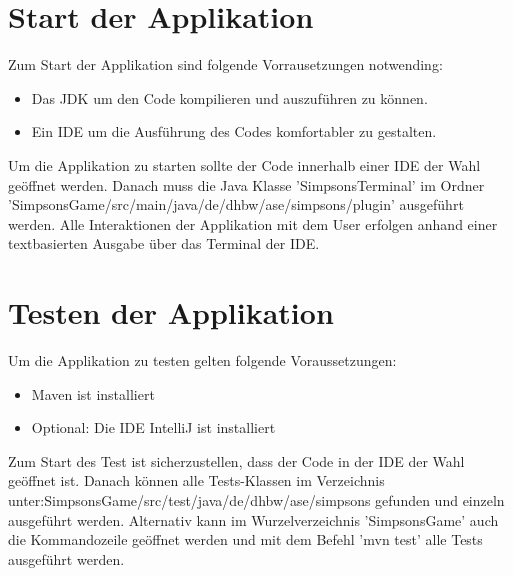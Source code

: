 \section{Start der Applikation}
Zum Start der Applikation sind folgende Vorrausetzungen notwending:
\begin{itemize}
    \item Das \ac{JDK} um den Code kompilieren und auszuführen zu können.
    \item Ein \ac{IDE} um die Ausführung des Codes komfortabler zu gestalten.
\end{itemize}
Um die Applikation zu starten sollte der Code innerhalb einer \ac{IDE} der Wahl geöffnet werden. Danach muss die Java Klasse 'SimpsonsTerminal' im Ordner 'SimpsonsGame/src/main/java/de/dhbw/ase/simpsons/plugin' ausgeführt werden. Alle Interaktionen der Applikation mit dem User erfolgen anhand einer textbasierten Ausgabe über das Terminal der \ac{IDE}.

\section{Testen der Applikation}
Um die Applikation zu testen gelten folgende Voraussetzungen:
\begin{itemize}
    \item Maven ist installiert
    \item Optional: Die \ac{IDE} IntelliJ ist installiert
\end{itemize}
Zum Start des Test ist sicherzustellen, dass der Code in der \ac{IDE} der Wahl geöffnet ist. Danach können alle Tests-Klassen im Verzeichnis unter:\newline SimpsonsGame/src/test/java/de/dhbw/ase/simpsons gefunden und einzeln ausgeführt werden. \newline
Alternativ kann im Wurzelverzeichnis 'SimpsonsGame' auch die Kommandozeile geöffnet werden und mit dem Befehl 'mvn test' alle Tests ausgeführt werden. \newline
